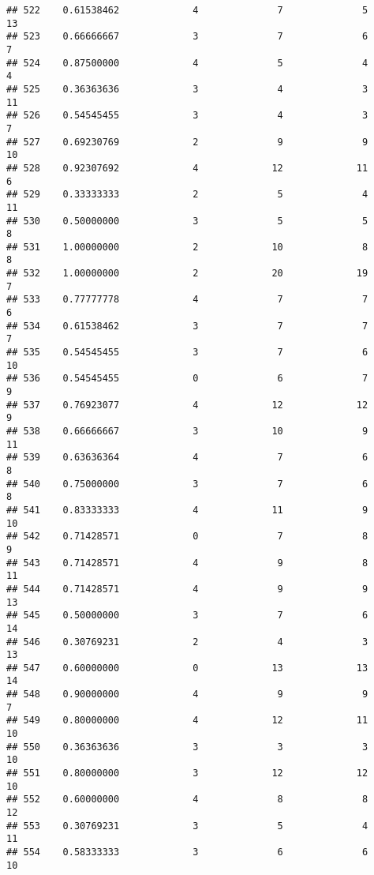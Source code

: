 \documentclass[
]{article}
\begin{document}
\begin{verbatim}
## 522    0.61538462             4              7              5             13
## 523    0.66666667             3              7              6              7
## 524    0.87500000             4              5              4              4
## 525    0.36363636             3              4              3             11
## 526    0.54545455             3              4              3              7
## 527    0.69230769             2              9              9             10
## 528    0.92307692             4             12             11              6
## 529    0.33333333             2              5              4             11
## 530    0.50000000             3              5              5              8
## 531    1.00000000             2             10              8              8
## 532    1.00000000             2             20             19              7
## 533    0.77777778             4              7              7              6
## 534    0.61538462             3              7              7              7
## 535    0.54545455             3              7              6             10
## 536    0.54545455             0              6              7              9
## 537    0.76923077             4             12             12              9
## 538    0.66666667             3             10              9             11
## 539    0.63636364             4              7              6              8
## 540    0.75000000             3              7              6              8
## 541    0.83333333             4             11              9             10
## 542    0.71428571             0              7              8              9
## 543    0.71428571             4              9              8             11
## 544    0.71428571             4              9              9             13
## 545    0.50000000             3              7              6             14
## 546    0.30769231             2              4              3             13
## 547    0.60000000             0             13             13             14
## 548    0.90000000             4              9              9              7
## 549    0.80000000             4             12             11             10
## 550    0.36363636             3              3              3             10
## 551    0.80000000             3             12             12             10
## 552    0.60000000             4              8              8             12
## 553    0.30769231             3              5              4             11
## 554    0.58333333             3              6              6             10

\end{verbatim}
\end{document}

